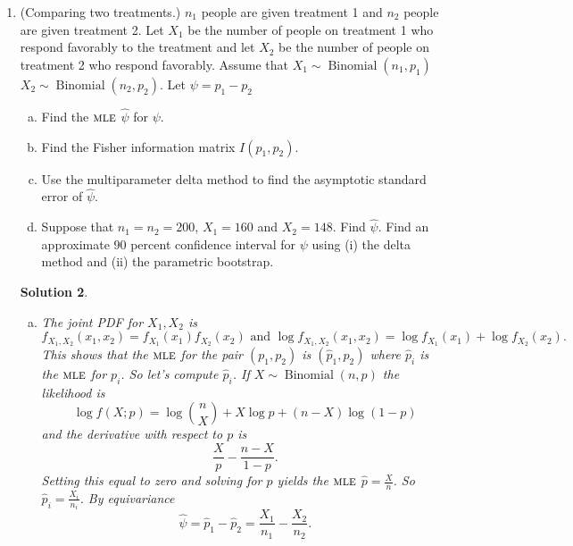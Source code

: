 \documentclass[10pt]{article}
\newtheorem*{sol}{Solution}
\newcommand{\E}{\mathbb{E}}
\newcommand{\Binom}{\operatorname{Binomial}}
\newcommand{\MLE}{\textsc{mle}}
\begin{document}
\begin{enumerate}
\begin{sol}
Finally, the score is
\[
s(x;\lambda)=\frac{\partial \log f(x;\lambda)}{\partial \lambda}
= \frac{\partial}{\partial \lambda} (x\log \lambda - \lambda -\log(x!))
= \frac{x}{\lambda} - 1 \text{ and } \frac{\partial s}{\partial \lambda}
=-\frac{x}{\lambda^2}
\]
The Fisher information is
\[
I(\lambda) = -\E\left(-\frac{X}{\lambda^2}\right) = \lambda / \lambda^2 = 1/\lambda.
\]
\end{sol}

\item[(7)] (Comparing two treatments.) $n_1$ people are given treatment 1 and $n_2$
people are given treatment 2. Let $X_1$ be the number of people on treatment
1 who respond favorably to the treatment and let $X_2$ be the
number of people on treatment 2 who respond favorably. Assume that
$X_1\sim \Binom(n_1,p_1)$ $X_2 \sim \Binom(n_2,p_2)$. Let $\psi=p_1-p_2$
\begin{enumerate}[(a)]
\item Find the $\MLE$ $\hat \psi$ for $\psi$.
\item Find the Fisher information matrix $I(p_1,p_2)$.
\item Use the multiparameter delta method to find the asymptotic standard
error of $\hat \psi$.
\item Suppose that $n_1=n_2=200$, $X_1=160$ and $X_2=148$. Find $\hat \psi$.
Find an approximate 90 percent confidence interval for $\psi$ using (i) the delta
method and (ii) the parametric bootstrap.
\end{enumerate}

\begin{sol}
\begin{enumerate}[(a)]
\item The joint PDF for $X_1,X_2$ is
\[
f_{X_1,X_2}(x_1,x_2)=f_{X_1}(x_1)f_{X_2}(x_2) \text{ and }
\log f_{X_1,X_2}(x_1,x_2) = \log f_{X_1}(x_1) + \log f_{X_2}(x_2).
\]
This shows that the $\MLE$ for the pair $(p_1,p_2)$ is $(\hat p_1,\hat p_2)$
where $\hat p_i$ is the $\MLE$ for $p_i$. So let's compute $\hat p_i$.
If $X\sim \Binom(n,p)$ the likelihood is
\[
\log f(X;p) = \log \binom{n}{X} + X\log p + (n-X)\log(1-p)
\]
and the derivative with respect to $p$ is
\[
\frac{X}{p} - \frac{n-X}{1-p}.
\]
Setting this equal to zero and solving for $p$ yields the $\MLE$
$\hat p = \frac{X}{n}$. So $\hat p_i = \frac{X_i}{n_i}$. By
equivariance
\[
\hat \psi = \hat p_1 - \hat p_2 = \frac{X_1}{n_1} - \frac{X_2}{n_2}.
\]


\end{enumerate}
\end{sol}
\end{enumerate}
\end{document}
